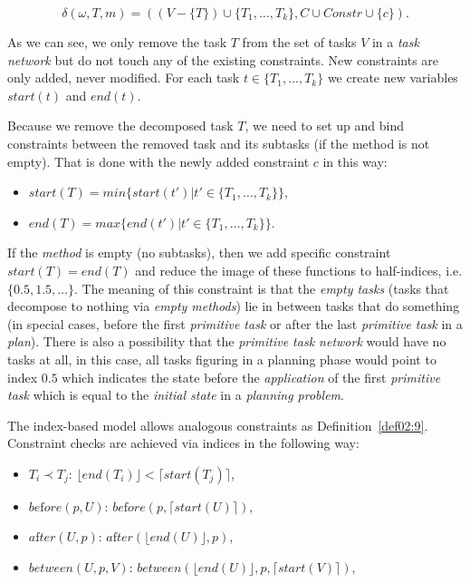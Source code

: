 \[
\delta(\omega, T, m) = ((V - \{ T \}) \cup \{ T_1, \dots, T_k \}, C \cup Constr \cup \{c\}).
\]

\noindent
As we can see, we only remove the task $T$ from the set of tasks $V$ in a \emph{task network} but do not touch any of the existing constraints. New constraints are only added, never modified. For each task $t \in \{ T_1, \dots, T_k \}$ we create new variables $start(t)$ and $end(t)$. 

\noindent
Because we remove the decomposed task $T$, we need to set up and bind constraints between the removed task and its subtasks (if the method is not empty). That is done with the newly added constraint $c$ in this way:

\begin{itemize}
    \item $start(T) = min\{ start(t') | t' \in \{ T_1, \dots, T_k \}\}$,

    \item $end(T) = max\{ end(t') | t' \in \{ T_1, \dots, T_k \}\}$.
\end{itemize}

\noindent
If the \emph{method} is empty (no subtasks), then we add specific constraint $start(T) = end(T)$ and reduce the image of these functions to half-indices, i.e. $\{ 0.5, 1.5, \dots\}$. The meaning of this constraint is that the \emph{empty tasks} (tasks that decompose to nothing via \emph{empty methods}) lie in between tasks that do something (in special cases, before the first \emph{primitive task} or after the last \emph{primitive task} in a \emph{plan}). There is also a possibility that the \emph{primitive task network} would have no tasks at all, in this case, all tasks figuring in a planning phase would point to index $0.5$ which indicates the state before the \emph{application} of the first \emph{primitive task} which is equal to the \emph{initial state} in a \emph{planning problem}.

\medskip\noindent
The index-based model allows analogous constraints as Definition~\ref{def02:9}. Constraint checks are achieved via indices in the following way:

\begin{itemize}
    \item $T_i \prec T_j$: $\lfloor end(T_i) \rfloor < \lceil start(T_j) \rceil$,

    \item $be\text{f}ore(p, U)$: $be\text{f}ore(p, \lceil start(U) \rceil)$,

    \item $a\text{f}ter(U, p)$: $a\text{f}ter(\lfloor end(U) \rfloor, p)$,

    \item $between(U, p, V)$: $between(\lfloor end(U) \rfloor, p, \lceil start(V) \rceil)$,
\end{itemize}

